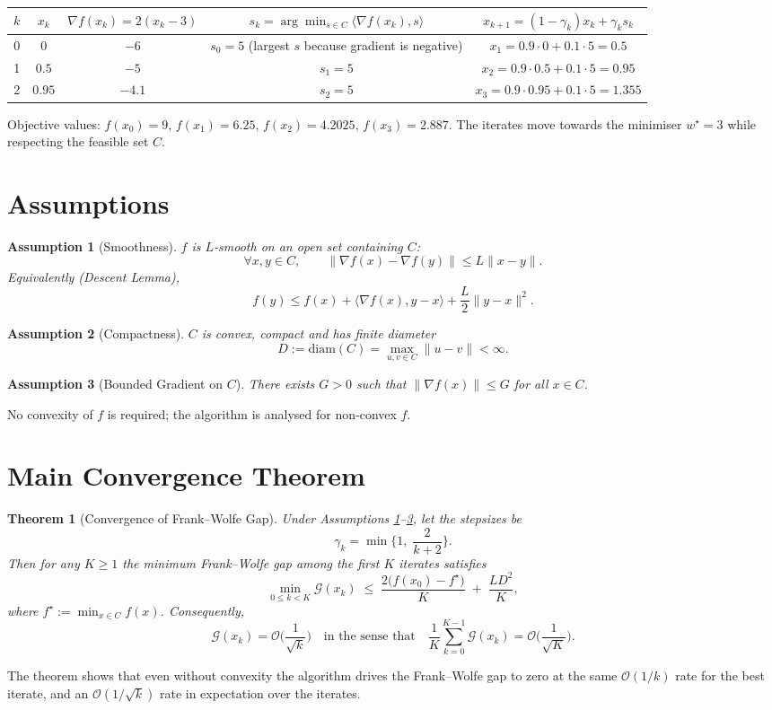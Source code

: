 \documentclass{article}
\newtheorem{theorem}{Theorem}
\newtheorem{assumption}{Assumption}
\newcommand{\grad}{\nabla}
\newcommand{\inner}[2]{\langle #1,#2\rangle}
\newcommand{\diam}{\mathrm{diam}}
\newcommand{\gap}{\mathcal{G}}
\begin{document}
\begin{center}
\begin{tabular}{c|c|c|c|c}
$k$ & $x_k$ & $\grad f(x_k)=2(x_k-3)$ & $s_k=\arg\min_{s\in C}\inner{\grad f(x_k)}{s}$ & $x_{k+1}=(1-\gamma_k)x_k+\gamma_k s_k$ \\ \hline
0 & $0$ & $-6$ & $s_0=5$ (largest $s$ because gradient is negative) & $x_1=0.9\cdot0+0.1\cdot5=0.5$ \\ \hline
1 & $0.5$ & $-5$ & $s_1=5$ & $x_2=0.9\cdot0.5+0.1\cdot5=0.95$ \\ \hline
2 & $0.95$ & $-4.1$ & $s_2=5$ & $x_3=0.9\cdot0.95+0.1\cdot5=1.355$ 
\end{tabular}
\end{center}
Objective values: $f(x_0)=9$, $f(x_1)=6.25$, $f(x_2)=4.2025$, $f(x_3)=2.887$.
The iterates move towards the minimiser $w^\star=3$ while respecting the feasible set $C$.

\section*{Assumptions}
\begin{assumption}[Smoothness]\label{ass:smooth}
$f$ is $L$‑smooth on an open set containing $C$:
\[
\forall x,y\in C,\qquad
\|\grad f(x)-\grad f(y)\| \le L\|x-y\|.
\]
Equivalently (Descent Lemma),
\[
f(y)\le f(x)+\inner{\grad f(x)}{y-x}+ \frac{L}{2}\|y-x\|^2 . \tag{3}
\]
\end{assumption}
\begin{assumption}[Compactness]\label{ass:compact}
$C$ is convex, compact and has finite diameter
\[
D:=\diam(C)=\max_{u,v\in C}\|u-v\|<\infty .
\]
\end{assumption}
\begin{assumption}[Bounded Gradient on $C$]\label{ass:gradbound}
There exists $G>0$ such that $\|\grad f(x)\|\le G$ for all $x\in C$.
\end{assumption}
No convexity of $f$ is required; the algorithm is analysed for non‑convex $f$.

\section*{Main Convergence Theorem}
\begin{theorem}[Convergence of Frank–Wolfe Gap]\label{thm:convergence}
Under Assumptions \ref{ass:smooth}–\ref{ass:gradbound}, let the stepsizes be
\[
\gamma_k = \min\!\Big\{1,\; \frac{2}{k+2}\Big\}.
\]
Then for any $K\ge 1$ the minimum Frank–Wolfe gap among the first $K$ iterates satisfies
\[
\min_{0\le k < K}\gap(x_k)\;\le\;
\frac{2\big(f(x_0)-f^\star\big)}{K} \;+\; \frac{L D^{2}}{K},\tag{4}
\]
where $f^\star:=\min_{x\in C}f(x)$. Consequently,
\[
\gap(x_{k}) = \mathcal O\!\Big(\frac{1}{\sqrt{k}}\Big)\quad\text{in the sense that}\quad
\frac{1}{K}\sum_{k=0}^{K-1}\gap(x_k)=\mathcal O\!\Big(\frac{1}{\sqrt{K}}\Big).
\]
\end{theorem}
The theorem shows that even without convexity the algorithm drives the Frank–Wolfe gap to zero at the same $\mathcal O(1/k)$ rate for the best iterate, and an $\mathcal O(1/\sqrt{k})$ rate in expectation over the iterates.
\end{document}
